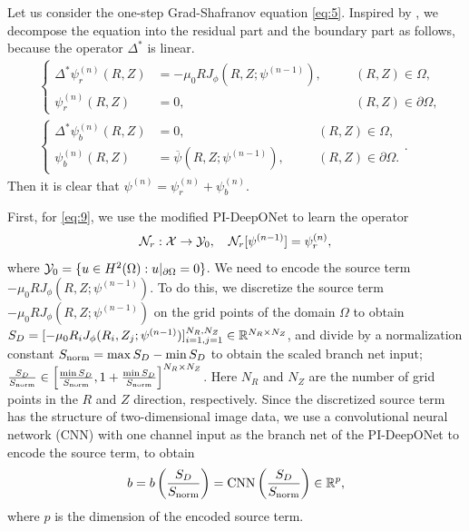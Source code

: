 Let us consider the one-step Grad-Shafranov equation \eqref{eq:5}.
Inspired by \cite{BENO}, we decompose the equation into the
residual part and the boundary part as follows, because the operator $\Delta^*$ is linear.
\begin{align}\label{eq:9}&\left\{
  \begin{aligned}
    \Delta^*\psi_r^{(n)}(R, Z) &= -\mu_0 R J_\phi(R, Z; \psi^{(n-1)}),& \quad &(R, Z) \in \Omega, \\
    \psi_r^{(n)}(R, Z) &= 0, & &(R, Z) \in \partial \Omega,
  \end{aligned}\right. \\
  \label{eq:10}&\left\{
  \begin{aligned}
    \Delta^*\psi_b^{(n)}(R, Z) &= 0, &\quad &(R, Z) \in \Omega, \\
    \psi_b^{(n)}(R, Z) &= \overline{\psi}(R, Z; \psi^{(n-1)}), & & (R, Z) \in \partial \Omega.
  \end{aligned}
  \right. .
\end{align}
Then it is clear that $\psi^{(n)} = \psi_r^{(n)} + \psi_b^{(n)}$.

First, for \eqref{eq:9}, we use the modified PI-DeepONet to learn the operator 
\[ \cal{N}_r: \cal{X} \to \cal{Y}_0, \quad  \cal{N}_r [\psi^{(n-1)}] = \psi_r^{(n)}, \]
where $\cal{Y}_0 = \{ u \in H^2(\Omega) : u|_{\partial \Omega} = 0 \}$.
We need to encode the source term $-\mu_0 R J_\phi(R, Z; \psi^{(n-1)})$.
To do this, we discretize the source term $-\mu_0 R J_\phi(R, Z; \psi^{(n-1)})$ on the grid
points of the domain $\Omega$ to obtain
$S_D = [
  -\mu_0 R_i J_\phi(R_i, Z_j; \psi^{(n-1)})
  ]_{i=1, j=1}^{N_R, N_Z} \in \bb{R}^{N_R \times N_Z}$,
and divide by a normalization constant 
$S_{\te{norm}} = \max S_D - \min S_D$
to obtain the scaled branch net input;
$\frac{S_D}{S_{\te{norm}}} \in \left[
\frac{\min S_D}{S_{\te{norm}}}, 1 + \frac{\min S_D}{S_{\te{norm}}}
\right]^{N_R \times N_Z}$.
Here $N_R$ and $N_Z$ are the number of grid points in the $R$ and $Z$ direction, respectively.
Since the discretized source term has the structure of two-dimensional image data,
we use a convolutional neural network (CNN) with one channel input 
as the branch net of the PI-DeepONet to encode the source term, to obtain 
\[ b = b\left(\frac{S_D}{S_{\te{norm}}}\right) = \te{CNN}\left(\frac{S_D}{S_{\te{norm}}}\right) \in \bb{R}^p, \]
where $p$ is the dimension of the encoded source term.

